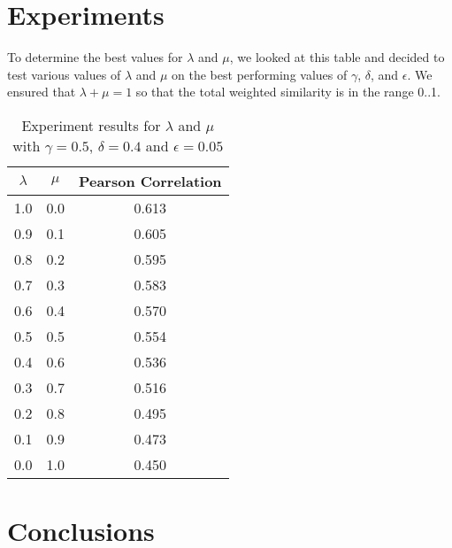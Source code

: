 \documentclass{article}
\begin{document}

\section{Experiments} \label{sec:experiments}

To determine the best values for $\lambda$ and $\mu$, we looked at this table and decided to test various values of $\lambda$ and $\mu$ on the best performing values of $\gamma$, $\delta$, and $\epsilon$. We ensured that $\lambda + \mu = 1$ so that the total weighted similarity is in the range 0..1.

\begin{table}[h!]
\centering
\begin{tabular}{|c|c||c|}
	\hline
	$\lambda$ & $\mu$ & Pearson Correlation \\
	\hline
	1.0 & 0.0 & 0.613 \\
	0.9 & 0.1 & 0.605 \\
	0.8 & 0.2 & 0.595 \\
	0.7 & 0.3 & 0.583 \\
	0.6 & 0.4 & 0.570 \\
	0.5 & 0.5 & 0.554 \\
	0.4 & 0.6 & 0.536 \\
	0.3 & 0.7 & 0.516 \\
	0.2 & 0.8 & 0.495 \\
	0.1 & 0.9 & 0.473 \\
	0.0 & 1.0 & 0.450 \\
	\hline
\end{tabular}
\caption{Experiment results for $\lambda$ and $\mu$ with $\gamma = 0.5$, $\delta = 0.4$ and $\epsilon = 0.05$}
\label{table:lambdamuresults}
\end{table}

\section{Conclusions} \label{sec:conclusions}
\end{document}
